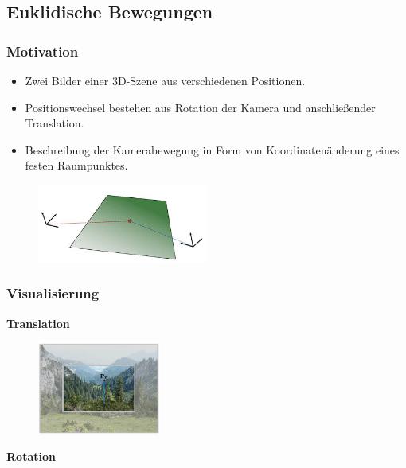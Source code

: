 \documentclass[12pt, a4paper, oneside]{article}
\begin{document}
\subsection{Euklidische Bewegungen}

\subsubsection{Motivation}

\begin{itemize}
    \item Zwei Bilder einer 3D-Szene aus verschiedenen Positionen.
    \item Positionswechsel bestehen aus Rotation der Kamera und anschließender Translation.
    \item Beschreibung der Kamerabewegung in Form von Koordinatenänderung eines festen Raumpunktes.
\end{itemize}

\begin{figure}[!h]
    \centering
    \includegraphics[width=0.5\textwidth]{../img/2-7.png}
    \label{img/2-7}
\end{figure}

\subsubsection{Visualisierung}

\textbf{Translation}

\begin{figure}[!h]
    \centering
    \includegraphics[width=0.36\textwidth]{../img/2-8.png}
    \label{img/2-8}
\end{figure}

\vspace{1em}
\textbf{Rotation}
\end{document}
